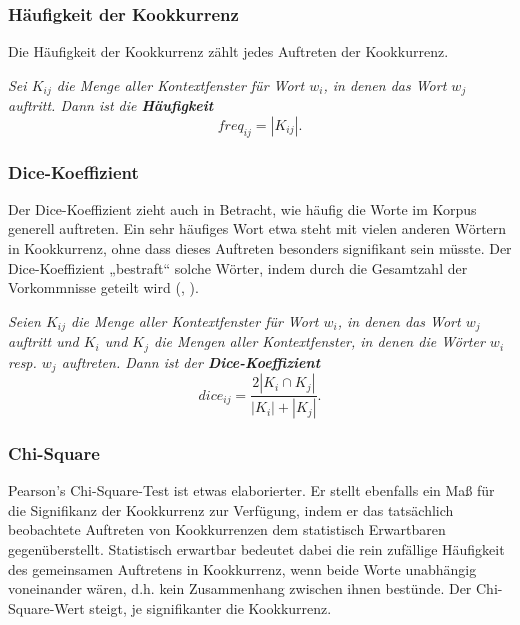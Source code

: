\documentclass[11pt,numbers=noenddot]{scrartcl}
\begin{document}
\subsubsection{Häufigkeit der Kookkurrenz} \label{freq}

Die Häufigkeit der Kookkurrenz zählt jedes Auftreten der Kookkurrenz.

\emph{Sei $K_{ij}$ die Menge aller Kontextfenster für Wort $w_i$, in denen das Wort $w_j$ auftritt. Dann ist die \textbf{Häufigkeit}}
\begin{equation*}
   freq_{ij} = |K_{ij}|.
\end{equation*}

\subsubsection{Dice-Koeffizient} \label{dice}

Der Dice-Koeffizient zieht auch in Betracht, wie häufig die Worte im Korpus generell auftreten. Ein sehr häufiges Wort etwa steht mit vielen anderen Wörtern in Kookkurrenz, ohne dass dieses Auftreten besonders signifikant sein müsste. Der Dice-Koeffizient „bestraft“ solche Wörter, indem durch die Gesamtzahl der Vorkommnisse geteilt wird (\citet[S.299]{manning1999}, \citet[S. 213]{heyer2008}).

\emph{Seien $K_{ij}$ die Menge aller Kontextfenster für Wort $w_i$, in denen das Wort $w_j$ auftritt und $K_{i}$ und $K_{j}$ die Mengen aller Kontextfenster, in denen die Wörter $w_i$ resp. $w_j$ auftreten. Dann ist der \textbf{Dice-Koeffizient}}
\begin{equation*}
   dice_{ij} = \frac{2 |K_{i} \cap K_{j}| }{|K_{i}| + |K_{j}|}.
\end{equation*}

\subsubsection{Chi-Square} \label{chi}

Pearson's Chi-Square-Test ist etwas elaborierter. Er stellt ebenfalls ein Maß für die Signifikanz der Kookkurrenz zur Verfügung, indem er das tatsächlich beobachtete Auftreten von Kookkurrenzen dem statistisch Erwartbaren gegenüberstellt. Statistisch erwartbar bedeutet dabei die rein zufällige Häufigkeit des gemeinsamen Auftretens in Kookkurrenz, wenn beide Worte unabhängig voneinander wären, d.h. kein Zusammenhang zwischen ihnen bestünde. Der Chi-Square-Wert steigt, je signifikanter die Kookkurrenz.
\end{document}
